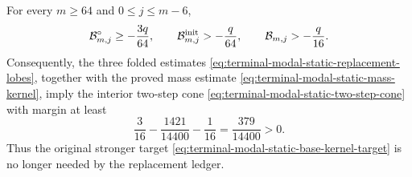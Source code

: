 \begin{lemma}
\label{lem:terminal-modal-static-base-bound}
For every $m\ge64$ and $0\le j\le m-6$,
\begin{equation}
 \mathcal B_{m,j}^\circ\ge-\frac{3q}{64},
 \qquad
 \mathcal B_{m,j}^{\rm init}>-\frac q{64},
 \qquad
 \mathcal B_{m,j}>-\frac q{16}.
 \label{eq:terminal-modal-static-base-weakened-bound}
\end{equation}
Consequently, the three folded estimates
\eqref{eq:terminal-modal-static-replacement-lobes}, together with the proved
mass estimate \eqref{eq:terminal-modal-static-mass-kernel}, imply the
interior two-step cone \eqref{eq:terminal-modal-static-two-step-cone} with
margin at least
\begin{equation}
 \frac3{16}-\frac{1421}{14400}-\frac1{16}
 =\frac{379}{14400}>0.
 \label{eq:terminal-modal-static-replacement-total-margin}
\end{equation}
Thus the original stronger target
\eqref{eq:terminal-modal-static-base-kernel-target} is no longer needed by
the replacement ledger.
\end{lemma}

